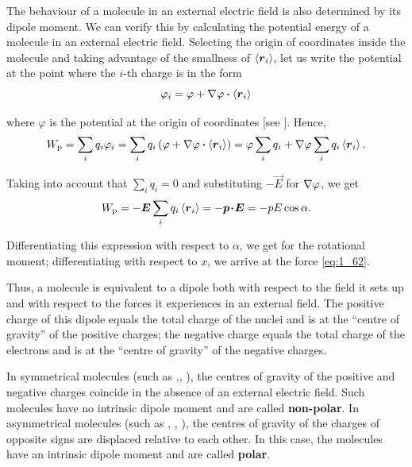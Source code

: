 The behaviour of a molecule in an external electric field is also determined by its dipole moment. We can verify this by calculating the potential energy of a molecule in an external electric field. Selecting the origin of coordinates inside the molecule and taking advantage of the smallness of $\left\langle \boldsymbol{r}_i \right\rangle$, let us write the potential at the point where the $i$-th charge is in the form
\begin{equation*}
    \varphi_i = \varphi + \nabla\varphi \boldsymbol{\cdot} \left\langle \boldsymbol{r}_i \right\rangle
\end{equation*}

\noindent
where $\varphi$ is the potential at the origin of coordinates [see ]. Hence,
\begin{equation*}
    W_{\text{p}} = \sum_i q_i \varphi_i = \sum_i q_i \left(\varphi + \nabla\varphi \boldsymbol{\cdot} \left\langle \boldsymbol{r}_i \right\rangle\right) = \varphi \sum_i q_i + \nabla\varphi \sum_i q_i \left\langle \boldsymbol{r}_i \right\rangle.
\end{equation*}

\noindent
Taking into account that $\sum_i q_i=0$ and substituting $-\vec{E}$ for $\nabla\varphi$, we get
\begin{equation*}
    W_{\text{p}} = -\boldsymbol{E} \sum_i q_i \left\langle \boldsymbol{r}_i \right\rangle = -\boldsymbol{p\!\cdot\!E} = -p E \cos\alpha.
\end{equation*}

\noindent
Differentiating this expression with respect to $\alpha$, we get  for the rotational moment; differentiating with respect to $x$, we arrive at the force \eqref{eq:1_62}.

Thus, a molecule is equivalent to a dipole both with respect to the field it sets up and with respect to the forces it experiences in an external field. The positive charge of this dipole equals the total charge of the nuclei and is at the ``centre of gravity'' of the positive charges; the negative charge equals the total charge of the electrons and is at the ``centre of gravity'' of the negative charges.

In symmetrical molecules (such as ,, ), the centres of gravity of the positive and negative charges coincide in the absence of an external electric field. Such molecules have no intrinsic dipole moment and are called \textbf{non-polar}. In asymmetrical molecules (such
as , , ), the centres of gravity of the charges of opposite signs are displaced relative to each other. In this case, the molecules have an intrinsic dipole moment and are called \textbf{polar}.


